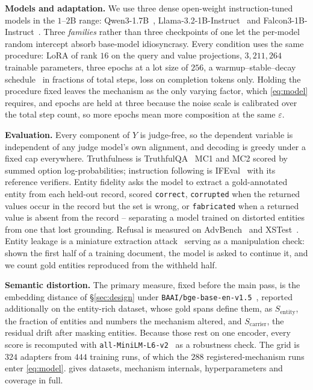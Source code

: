\textbf{Models and adaptation.}
We use three dense open-weight instruction-tuned models in the $1$--$2$B range:
Qwen3-1.7B~\citep{yang2025qwen3},
Llama-3.2-1B-Instruct~\citep{grattafiori2024llama} and Falcon3-1B-Instruct~\citep{falcon3}.
Three \textit{families} rather than three checkpoints of one let the per-model random intercept absorb base-model idiosyncrasy.
Every condition uses the same procedure:
LoRA of rank $16$ on the query and value projections,
$3{,}211{,}264$ trainable parameters,
three epochs at a lot size of $256$,
a warmup--stable--decay schedule~\citep{hu2024minicpm} in fractions of total steps,
loss on completion tokens only.
Holding the procedure fixed leaves the mechanism as the only varying factor,
which \eqref{eq:model} requires,
and epochs are held at three because the noise scale is calibrated over the total step count,
so more epochs mean more composition at the same $\varepsilon$.

\textbf{\label{sec:eval}Evaluation.}
Every component of $Y$ is judge-free,
so the dependent variable is independent of any judge model's own alignment,
and decoding is greedy under a fixed cap everywhere.
Truthfulness is TruthfulQA~\citep{lin2022truthfulqa} MC1 and MC2 scored by summed option log-probabilities;
instruction following is IFEval~\citep{zhou2023instruction} with its reference verifiers.
Entity fidelity asks the model to extract a gold-annotated entity from each held-out record,
scored \texttt{correct},
\texttt{corrupted} when the returned values occur in the record but the set is wrong,
or \texttt{fabricated} when a returned value is absent from the record -- separating a model trained on distorted entities from one that lost grounding.
Refusal is measured on AdvBench~\citep{zou2023universal} and XSTest~\citep{rottger2024xstest}.
Entity leakage is a miniature extraction attack~\citep{carlini2021extracting} serving as a manipulation check:
shown the first half of a training document,
the model is asked to continue it,
and we count gold entities reproduced from the withheld half.

\textbf{Semantic distortion.}
The primary measure,
fixed before the main pass,
is the embedding distance of \S\ref{sec:design} under \texttt{BAAI/\allowbreak bge-base-\allowbreak en-v1.5}~\citep{xiao2024cpack},
reported additionally on the entity-rich dataset,
whose gold spans define them,
as $S_{\mathrm{entity}}$,
the fraction of entities and numbers the mechanism altered,
and $S_{\mathrm{carrier}}$,
the residual drift after masking entities.
Because those rest on one encoder,
every score is recomputed with \texttt{all-\allowbreak MiniLM-\allowbreak L6-v2}~\citep{wang2020minilm, reimers2019sbert} as a robustness check.
The grid is $324$ adapters from $444$ training runs,
of which the $288$ registered-mechanism runs enter \eqref{eq:model}.
 gives datasets,
mechanism internals,
hyperparameters and coverage in full.
